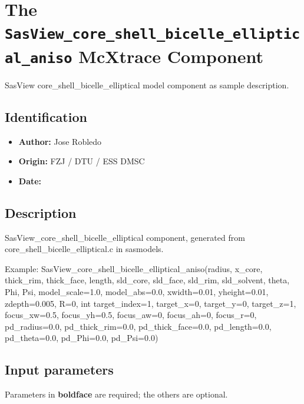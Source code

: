 \section{The \texttt{SasView\_core\_shell\_bicelle\_elliptical\_aniso} McXtrace Component}
SasView core\_shell\_bicelle\_elliptical model component as sample description.

\subsection*{Identification}
\begin{itemize}
  \item \textbf{Author:} Jose Robledo
  \item \textbf{Origin:} FZJ / DTU / ESS DMSC
  \item \textbf{Date:} 
\end{itemize}

\subsection*{Description}
SasView\_core\_shell\_bicelle\_elliptical component, generated from core\_shell\_bicelle\_elliptical.c in sasmodels.

Example: SasView\_core\_shell\_bicelle\_elliptical\_aniso(radius, x\_core, thick\_rim, thick\_face, length, sld\_core, sld\_face, sld\_rim, sld\_solvent, theta, Phi, Psi, model\_scale=1.0, model\_abs=0.0, xwidth=0.01, yheight=0.01, zdepth=0.005, R=0, int target\_index=1, target\_x=0, target\_y=0, target\_z=1, focus\_xw=0.5, focus\_yh=0.5, focus\_aw=0, focus\_ah=0, focus\_r=0, pd\_radius=0.0, pd\_thick\_rim=0.0, pd\_thick\_face=0.0, pd\_length=0.0, pd\_theta=0.0, pd\_Phi=0.0, pd\_Psi=0.0)

\subsection*{Input parameters}
Parameters in \textbf{boldface} are required; the others are optional.

